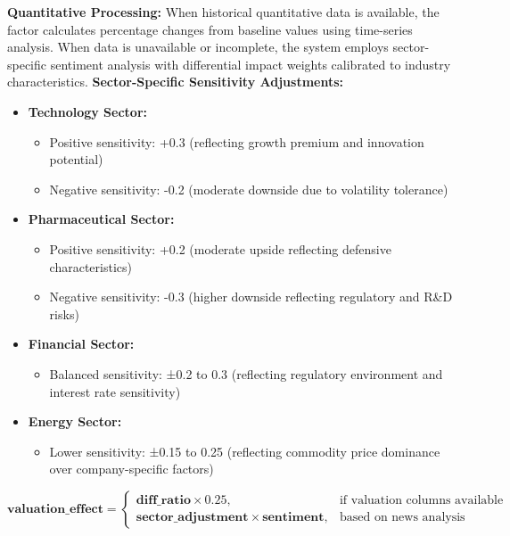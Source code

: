 \documentclass[3p,times,procedia]{elsarticle}
\begin{document}
\textbf{Quantitative Processing:} When historical quantitative data is available, the factor calculates percentage changes from baseline values using time-series analysis. When data is unavailable or incomplete, the system employs sector-specific sentiment analysis with differential impact weights calibrated to industry characteristics.
\vspace{0.2cm}
\textbf{Sector-Specific Sensitivity Adjustments:}
\begin{itemize}
    \item \textbf{Technology Sector:} 
    \begin{itemize}
        \item Positive sensitivity: +0.3 (reflecting growth premium and innovation potential)
        \item Negative sensitivity: -0.2 (moderate downside due to volatility tolerance)
    \end{itemize}
    
    \item \textbf{Pharmaceutical Sector:}
    \begin{itemize}
        \item Positive sensitivity: +0.2 (moderate upside reflecting defensive characteristics)
        \item Negative sensitivity: -0.3 (higher downside reflecting regulatory and R\&D risks)
    \end{itemize}
    
    \item \textbf{Financial Sector:}
    \begin{itemize}
        \item Balanced sensitivity: ±0.2 to 0.3 (reflecting regulatory environment and interest rate sensitivity)
    \end{itemize}
    
    \item \textbf{Energy Sector:}
    \begin{itemize}
        \item Lower sensitivity: ±0.15 to 0.25 (reflecting commodity price dominance over company-specific factors)
        \vspace{-0.6cm}
    \end{itemize}
\end{itemize}
\begin{equation}
\textbf{valuation\_effect} = 
\begin{cases} 
\textbf{diff\_ratio} \times 0.25, & \text{if valuation columns available} \\
\textbf{sector\_adjustment} \times \textbf{sentiment}, & \text{based on news analysis}
\end{cases}
\end{equation}
\end{document}
